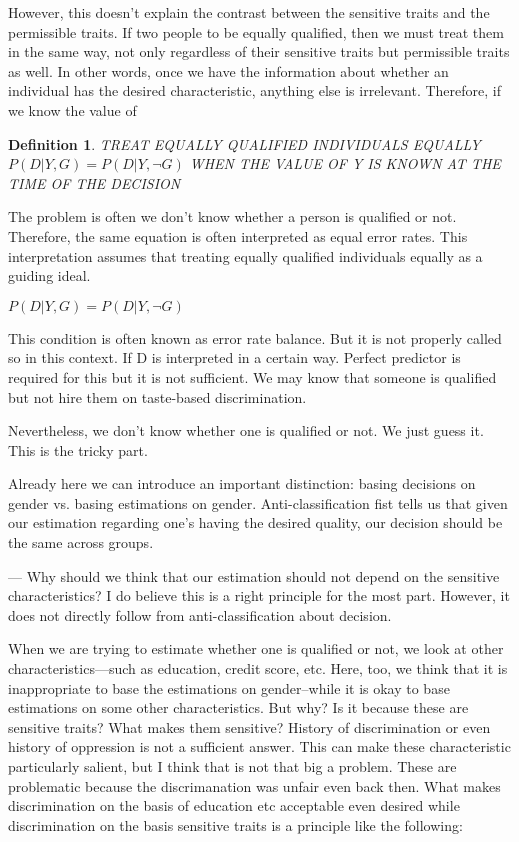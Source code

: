 \documentclass{article}
\newtheorem{definition}{Definition}
\begin{document}
However, this doesn't explain the contrast between the sensitive traits and the permissible traits. If two people to be equally qualified, then we must treat them in the same way, not only regardless of their sensitive traits but permissible traits as well. In other words, once we have the information about whether an individual has the desired characteristic, anything else is irrelevant. Therefore, if we know the value of 


\begin{definition}
  TREAT EQUALLY QUALIFIED INDIVIDUALS EQUALLY 
$ P(D|Y, G) =  P(D|Y, \neg G)$ WHEN THE VALUE OF Y IS KNOWN AT THE TIME OF THE DECISION
\end{definition}

The problem is often we don't know whether a person is qualified or not. Therefore, the same equation is often interpreted as equal error rates. This interpretation assumes that treating equally qualified individuals equally as a guiding ideal. 

$ P(D|Y, G) =  P(D|Y, \neg G)$

This condition is often known as error rate balance. But it is not properly called so in this context. If D is interpreted in a certain way. Perfect predictor is required for this but it is not sufficient. We may know that someone is qualified but not hire them on taste-based discrimination. 

Nevertheless, we don't know whether one is qualified or not. We just guess it. This is the tricky part. 

Already here we can introduce an important distinction: basing decisions on gender vs. basing estimations on gender. Anti-classification fist tells us that given our estimation regarding one's having the desired quality, our decision should be the same across groups. 

--- Why should we think that our estimation should not depend on the sensitive characteristics? I do believe this is a right principle for the most part. However, it does not directly follow from anti-classification about decision. 

When we are trying to estimate whether one is qualified or not, we look at other characteristics---such as education, credit score, etc. Here, too, we think that it is inappropriate to base the estimations on gender--while it is okay to base estimations on some other characteristics. But why? Is it because these are sensitive traits? What makes them sensitive? History of discrimination or even history of oppression is not a sufficient answer. This can make these characteristic particularly salient, but I think that is not that big a problem. These are problematic because the discrimanation was unfair even back then. What makes discrimination on the basis of education etc acceptable even desired while discrimination on the basis sensitive traits is a principle like the following:
\end{document}
